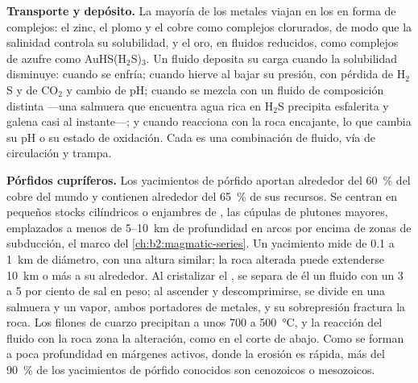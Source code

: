 \textbf{Transporte y depósito.} La mayoría de los metales viajan en los  en forma de complejos:
el zinc, el plomo y el cobre como complejos clorurados, de modo que la salinidad controla su solubilidad, y el oro,
en fluidos reducidos, como complejos de azufre como AuHS(H$_2$S)$_3$. Un fluido deposita su carga cuando la
solubilidad disminuye: cuando se enfría; cuando hierve al bajar su presión, con pérdida de H$_2$S y de CO$_2$ y
cambio de pH; cuando se mezcla con un fluido de composición distinta ---una salmuera que encuentra agua rica
en H$_2$S precipita esfalerita y galena casi al instante---; y cuando reacciona con la roca
encajante, lo que cambia su pH o su estado de oxidación. Cada  es una combinación de fluido,
vía de circulación y trampa.

\textbf{Pórfidos cupríferos.} Los yacimientos de pórfido aportan alrededor del \qty{60}{\percent} del cobre del
mundo y contienen alrededor del \qty{65}{\percent} de sus recursos. Se centran en pequeños stocks cilíndricos
o enjambres de , las cúpulas de plutones mayores, emplazados a menos de 5--\qty{10}{km} de profundidad en
arcos por encima de zonas de subducción, el marco del \cref{ch:b2:magmatic-series}. Un yacimiento mide de 0.1 a
\qty{1}{km} de diámetro, con una altura similar; la roca alterada puede extenderse \qty{10}{km} o más a su alrededor.
Al cristalizar el , se separa de él un fluido con un 3 a 5 por ciento de sal en peso; al ascender y
descomprimirse, se divide en una salmuera y un vapor, ambos portadores de metales, y su sobrepresión
fractura la roca. Los filones de cuarzo precipitan a unos 700 a \qty{500}{\celsius}, y la
reacción del fluido con la roca zona la alteración, como en el corte de abajo. Como se
forman a poca profundidad en márgenes activos, donde la erosión es rápida, más del \qty{90}{\percent} de los
yacimientos de pórfido conocidos son cenozoicos o mesozoicos.

